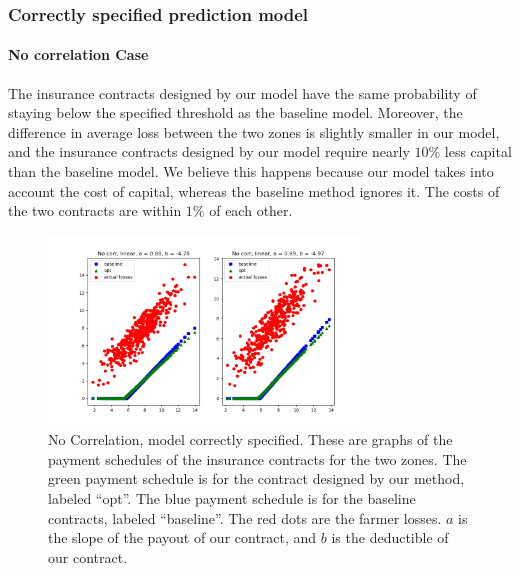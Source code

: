 \documentclass[11pt]{article}
\begin{document}
    \subsubsection{Correctly specified prediction model}
      \paragraph{No correlation Case} The insurance contracts designed by our model have the same probability of staying below the specified threshold as the baseline model. Moreover, the difference in average loss between the two zones is slightly smaller in our model, and the insurance contracts designed by our model require nearly $10\%$ less capital than the baseline model. We believe this happens because our model takes into account the cost of capital, whereas the baseline method ignores it. The costs of the two contracts are within $1\%$ of each other. 
      \begin{figure}[H]
          \centering
          \includegraphics[width=0.75\textwidth]{../../output/figures/Exploration/no_correlation_linear.png}
          \caption{No Correlation, model correctly specified. These are graphs of the payment schedules of the insurance contracts for the two zones. The green payment schedule is for the contract designed by our method, labeled ``opt''. The blue payment schedule is for the baseline contracts, labeled ``baseline''. The red dots are the farmer losses. $a$ is the slope of the payout of our contract, and $b$ is the deductible of our contract.}
      \end{figure}
\end{document}
